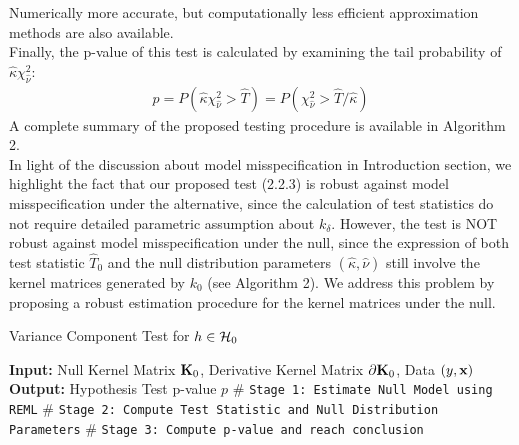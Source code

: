 \documentclass[11pt]{article}
\begin{document}
Numerically more accurate, but computationally less efficient approximation methods are also available.\\
Finally, the p-value of this test is calculated by examining the tail probability of $\hat{\kappa} \chi_{\hat{\nu}}^2$:
\begin{align*}
p=P(\hat{\kappa} \chi_{\hat{\nu}}^2>\hat{T})=P(\chi_{\hat{\nu}}^2>\hat{T}/\hat{\kappa})
\end{align*}
A complete summary of the proposed testing procedure is available in Algorithm 2.\\
In light of the discussion about model misspecification in Introduction section, we highlight the fact that our proposed test (2.2.3) is robust against model misspecification under the alternative, since the calculation of test statistics do not require detailed parametric assumption about $k_\delta$. However, the test is NOT robust against model misspecification under the null, since the expression of both test statistic $\hat{T}_0$ and the null distribution parameters $(\hat{\kappa}, \hat{\nu})$ still involve the kernel matrices generated by $k_0$ (see Algorithm 2). We address this problem by proposing a robust estimation procedure for the kernel matrices under the null.

\begin{algorithm}
\caption{Variance Component Test for $h \in {\cal H}_0$} 
\label{alg:cvek}
\begin{algorithmic}[1]
\newline
\textbf{Input:} Null Kernel Matrix ${\bf K}_0$, Derivative Kernel Matrix $\partial {\bf K}_0$, Data $(y, {\bf x})$\newline
\textbf{Output:} Hypothesis Test p-value $p$\newline
$\#$ \texttt{Stage 1: Estimate Null Model using REML}
\newline
$\#$ \texttt{Stage 2: Compute Test Statistic and Null Distribution Parameters}
\newline
$\#$ \texttt{Stage 3: Compute p-value and reach conclusion}
\EndProcedure
\end{algorithmic}
\end{algorithm}
\end{document}
